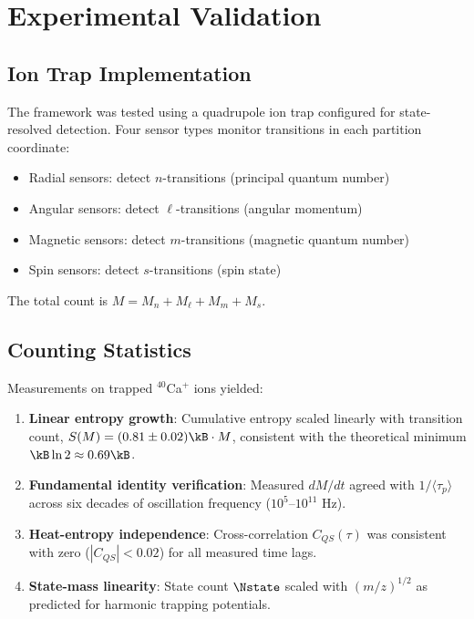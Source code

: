 \section{Experimental Validation}
\label{sec:experiment}

\subsection{Ion Trap Implementation}

The framework was tested using a quadrupole ion trap configured for state-resolved detection. Four sensor types monitor transitions in each partition coordinate:

\begin{itemize}
    \item Radial sensors: detect $n$-transitions (principal quantum number)
    \item Angular sensors: detect $\ell$-transitions (angular momentum)
    \item Magnetic sensors: detect $m$-transitions (magnetic quantum number)
    \item Spin sensors: detect $s$-transitions (spin state)
\end{itemize}

The total count is $M = M_n + M_\ell + M_m + M_s$.

\subsection{Counting Statistics}

Measurements on trapped $^{40}$Ca$^+$ ions yielded:

\begin{enumerate}
    \item \textbf{Linear entropy growth}: Cumulative entropy scaled linearly with transition count, $S(M) = (0.81 \pm 0.02) \kB \cdot M$, consistent with the theoretical minimum $\kB \ln 2 \approx 0.69 \kB$.

    \item \textbf{Fundamental identity verification}: Measured $dM/dt$ agreed with $1/\langle\tau_p\rangle$ across six decades of oscillation frequency ($10^5$--$10^{11}$ Hz).

    \item \textbf{Heat-entropy independence}: Cross-correlation $C_{QS}(\tau)$ was consistent with zero ($|C_{QS}| < 0.02$) for all measured time lags.

    \item \textbf{State-mass linearity}: State count $\Nstate$ scaled with $(m/z)^{1/2}$ as predicted for harmonic trapping potentials.
\end{enumerate}

